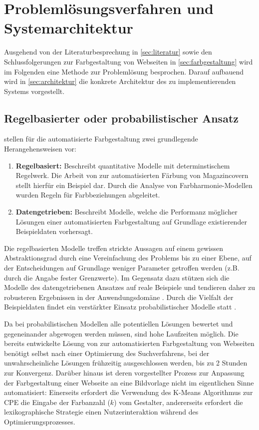 \section{Problemlösungsverfahren und Systemarchitektur}
\label{sec:architecture}

Ausgehend von der Literaturbesprechung in \autoref{sec:literatur} sowie den Schlussfolgerungen zur Farbgestaltung von Webseiten in \autoref{sec:farbgestaltung} wird im Folgenden eine Methode zur Problemlösung besprochen. Darauf aufbauend wird in \autoref{sec:architektur} die konkrete Architektur des zu implementierenden Systems vorgestellt.

\subsection{Regelbasierter oder probabilistischer Ansatz}
\label{sec:ansatz}

\citet{webpage} stellen für die automatisierte Farbgestaltung zwei grundlegende Herangehensweisen vor:

\begin{enumerate}
	\item \textbf{Regelbasiert:} Beschreibt quantitative Modelle mit determinstischem Regelwerk. Die Arbeit von \citet{magazines} zur automatisierten Färbung von Magazincovern stellt hierfür ein Beispiel dar. Durch die Analyse von Farbharmonie-Modellen wurden Regeln für Farbbeziehungen abgeleitet.
	\item \textbf{Datengetrieben:} Beschreibt Modelle, welche die Performanz möglicher Lösungen einer automatisierten Farbgestaltung auf Grundlage existierender Beispieldaten vorhersagt.
\end{enumerate}

Die regelbasierten Modelle treffen strickte Aussagen auf einem gewissen Abstraktionsgrad durch eine Vereinfachung des Problems bis zu einer Ebene, auf der Entscheidungen auf Grundlage weniger Parameter getroffen werden (z.B. durch die Angabe fester Grenzwerte). Im Gegensatz dazu stützen sich die Modelle des datengetriebenen Ansatzes auf reale Beispiele und tendieren daher zu robusteren Ergebnissen in der Anwendungsdomäne \citep{webpage}. Durch die Vielfalt der Beispieldaten findet ein verstärkter Einsatz probabilistischer Modelle statt \citep[siehe z.B.][]{webpage, patterns}.

Da bei probabilistischen Modellen alle potentiellen Lösungen bewertet und gegeneinander abgewogen werden müssen, sind hohe Laufzeiten möglich. Die bereits entwickelte Lösung von \citet{webpage} zur automatisierten Farbgestaltung von Webseiten benötigt selbst nach einer Optimierung des Suchverfahrens, bei der unwahrscheinliche Lösungen frühzeitig ausgeschlossen werden, bis zu 2 Stunden zur Konvergenz. Darüber hinaus ist deren vorgestellter Prozess zur Anpassung der Farbgestaltung einer Webseite an eine Bildvorlage nicht im eigentlichen Sinne automatisiert: Einerseits erfordert die Verwendung des K-Means Algorithmus zur CPE die Eingabe der Farbanzahl ($k$) vom Gestalter, andererseits erfordert die lexikographische Strategie einen Nutzerinteraktion während des Optimierungsprozesses.

